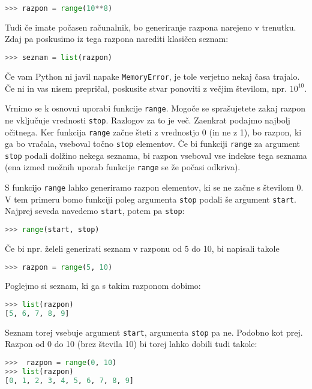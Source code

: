 \begin{lstlisting}[language=Python, showstringspaces=false]
>>> razpon = range(10**8)
\end{lstlisting}
Tudi če imate počasen računalnik, bo generiranje razpona narejeno v trenutku. Zdaj pa poskusimo iz tega razpona narediti klasičen seznam:
\begin{lstlisting}[language=Python, showstringspaces=false]
>>> seznam = list(razpon)
\end{lstlisting}
Če vam Python ni javil napake \texttt{MemoryError}, je tole verjetno nekaj časa trajalo. Če ni in vas nisem prepričal, poskusite stvar ponoviti z večjim številom, npr. $10^{10}$. 

Vrnimo se k osnovni uporabi funkcije \texttt{range}. Mogoče se sprašujetete zakaj razpon ne vključuje vrednosti \texttt{stop}. Razlogov za to je več. Zaenkrat podajmo najbolj očitnega. Ker funkcija \texttt{range} začne šteti z vrednostjo 0 (in ne z 1), bo razpon, ki ga bo vračala, vseboval točno \texttt{stop} elementov. Če bi funkciji \texttt{range} za argument \texttt{stop} podali dolžino nekega seznama, bi razpon vseboval vse indekse tega seznama (ena izmed možnih uporab funkcije \texttt{range} se že počasi odkriva). 

S funkcijo \texttt{range} lahko generiramo razpon elementov, ki se ne začne s številom 0. V tem primeru bomo funkciji poleg argumenta \texttt{stop} podali še argument \texttt{start}. Najprej seveda navedemo \texttt{start}, potem pa \texttt{stop}:
\begin{lstlisting}[language=Python, showstringspaces=false]
>>> range(start, stop)
\end{lstlisting}
Če bi npr. želeli generirati seznam v razponu od 5 do 10, bi napisali takole
\begin{lstlisting}[language=Python, showstringspaces=false]
>>> razpon = range(5, 10)
\end{lstlisting}
Poglejmo si seznam, ki ga s takim razponom dobimo:
\begin{lstlisting}[language=Python, showstringspaces=false]
>>> list(razpon)
[5, 6, 7, 8, 9]
\end{lstlisting}
Seznam torej vsebuje argument \texttt{start}, argumenta \texttt{stop} pa ne. Podobno kot prej. Razpon od 0 do 10 (brez števila 10) bi torej lahko dobili tudi takole:
\begin{lstlisting}[language=Python, showstringspaces=false]
>>>  razpon = range(0, 10)
>>> list(razpon)
[0, 1, 2, 3, 4, 5, 6, 7, 8, 9]
\end{lstlisting}

